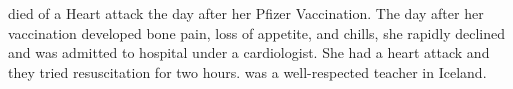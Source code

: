  died of a Heart attack the day after her Pfizer Vaccination.  The day
after her vaccination  developed bone pain, loss of appetite, and
chills, she rapidly declined and was admitted to hospital under a cardiologist.
She had a heart attack and they tried resuscitation for two hours.  
was a well-respected teacher in Iceland.

